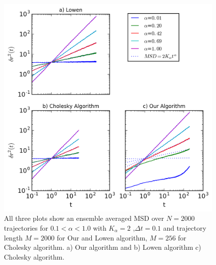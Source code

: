 \documentclass[
  a4paper,BCOR10mm,oneside,
  headsepline,footsepline,%
  fleqn,openbib
]{scrbook}
\begin{document}

\begin{figure}[h!]
\centering
\includegraphics[width=\textwidth]{./data/alpha_changethree.png}
\caption{All three plots show an ensemble averaged MSD over $N=2000$ trajectories for $0.1<\alpha<1.0$  with $K_{\alpha}=2$ ,$\Delta t = 0.1$ and trajectory length $M=2000$  for Our and Lowen algorithm, $M=256$ for Cholesky algorithm. a) Our algorithm and b) Lowen algorithm c) Cholesky algorithm.}
\label{alphachange}
\end{figure}
\end{document}
